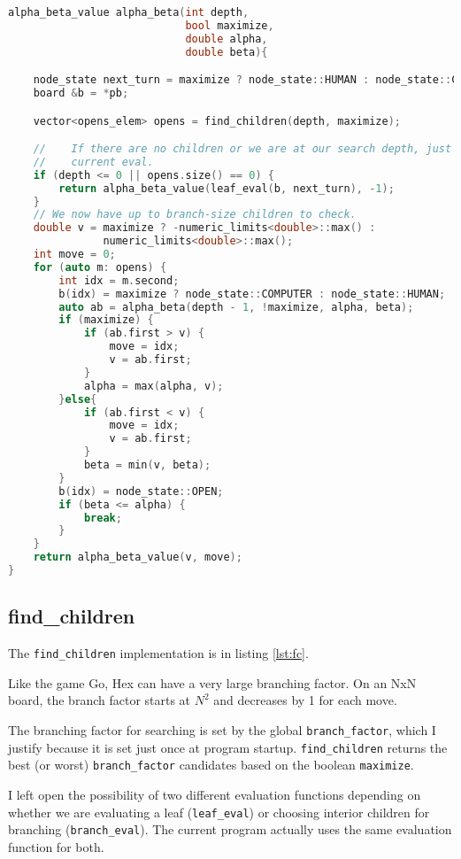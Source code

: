 \documentclass[12pt,titlepage]{amsart}
\begin{document}
\singlespacing
\begin{lstlisting}[language=C++,float,label={lst:ab},basicstyle=\small,
                   caption=$\alpha-\beta$]
alpha_beta_value alpha_beta(int depth,
                            bool maximize,
                            double alpha,
                            double beta){

    node_state next_turn = maximize ? node_state::HUMAN : node_state::COMPUTER;
    board &b = *pb;

    vector<opens_elem> opens = find_children(depth, maximize);

    //    If there are no children or we are at our search depth, just return
    //    current eval.
    if (depth <= 0 || opens.size() == 0) {
        return alpha_beta_value(leaf_eval(b, next_turn), -1);
    }
    // We now have up to branch-size children to check.
    double v = maximize ? -numeric_limits<double>::max() :
               numeric_limits<double>::max();
    int move = 0;
    for (auto m: opens) {
        int idx = m.second;
        b(idx) = maximize ? node_state::COMPUTER : node_state::HUMAN;
        auto ab = alpha_beta(depth - 1, !maximize, alpha, beta);
        if (maximize) {
            if (ab.first > v) {
                move = idx;
                v = ab.first;
            }
            alpha = max(alpha, v);
        }else{
            if (ab.first < v) {
                move = idx;
                v = ab.first;
            }
            beta = min(v, beta);
        }
        b(idx) = node_state::OPEN;
        if (beta <= alpha) {
            break;
        }
    }
    return alpha_beta_value(v, move);
}
\end{lstlisting}
\doublespacing
\subsection{find\_children}

The \texttt{find\_children} implementation is in listing \ref{lst:fc}.

Like the game Go, Hex can have a very large branching factor. On an NxN board,
the branch factor starts at $N^2$ and decreases by 1 for each move.

The branching factor for searching is set by the global \texttt{branch\_factor},
which I justify because it is set just once at program startup.
\texttt{find\_children} returns the best (or worst) \texttt{branch\_factor}
candidates based on the boolean \texttt{maximize}.

I left open the possibility of two different evaluation functions depending on
whether we are evaluating a leaf (\texttt{leaf\_eval}) or choosing interior
children for branching (\texttt{branch\_eval}). The current program actually
uses the same evaluation function for both.
\end{document}
